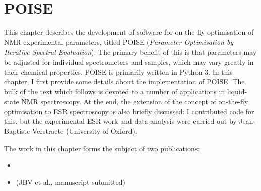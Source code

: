 \chapter{POISE}
\label{chpt:poise}

This chapter describes the development of software for on-the-fly optimisation of NMR experimental parameters, titled POISE (\textit{Parameter Optimisation by Iterative Spectral Evaluation}).
The primary benefit of this is that parameters may be adjusted for individual spectrometers and samples, which may vary greatly in their chemical properties.
POISE is primarily written in Python 3.
In this chapter, I first provide some details about the implementation of POISE.
The bulk of the text which follows is devoted to a number of applications in liquid-state NMR spectroscopy.
At the end, the extension of the concept of on-the-fly optimisation to ESR spectroscopy is also briefly discussed: I contributed code for this, but the experimental ESR work and data analysis were carried out by Jean-Baptiste Verstraete (University of Oxford).

The work in this chapter forms the subject of two publications:

\begin{itemize}
    \item {}
    \item (JBV et al., manuscript submitted)
\end{itemize}

\clearpage







\printbibliography[heading=subbibnumbered]{}
